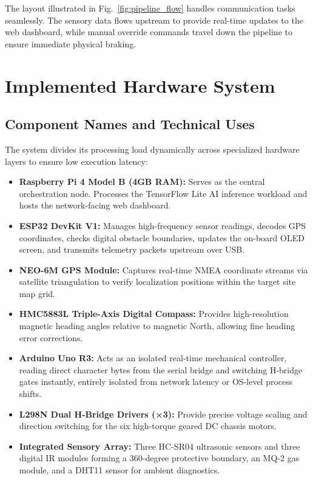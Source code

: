 \documentclass[conference]{IEEEtran}
\begin{document}
The layout illustrated in Fig.~\ref{fig:pipeline_flow} handles communication tasks seamlessly. The sensory data flows upstream to provide real-time updates to the web dashboard, while manual override commands travel down the pipeline to ensure immediate physical braking.

\section{Implemented Hardware System}

\subsection{Component Names and Technical Uses}
The system divides its processing load dynamically across specialized hardware layers to ensure low execution latency:
\begin{itemize}
    \item \textbf{Raspberry Pi 4 Model B (4GB RAM):} Serves as the central orchestration node. Processes the TensorFlow Lite AI inference workload and hosts the network-facing web dashboard.
    \item \textbf{ESP32 DevKit V1:} Manages high-frequency sensor readings, decodes GPS coordinates, checks digital obstacle boundaries, updates the on-board OLED screen, and transmits telemetry packets upstream over USB.
    \item \textbf{NEO-6M GPS Module:} Captures real-time NMEA coordinate streams via satellite triangulation to verify localization positions within the target site map grid.
    \item \textbf{HMC5883L Triple-Axis Digital Compass:} Provides high-resolution magnetic heading angles relative to magnetic North, allowing fine heading error corrections.
    \item \textbf{Arduino Uno R3:} Acts as an isolated real-time mechanical controller, reading direct character bytes from the serial bridge and switching H-bridge gates instantly, entirely isolated from network latency or OS-level process shifts.
    \item \textbf{L298N Dual H-Bridge Drivers (×3):} Provide precise voltage scaling and direction switching for the six high-torque geared DC chassis motors.
    \item \textbf{Integrated Sensory Array:} Three HC-SR04 ultrasonic sensors and three digital IR modules forming a 360-degree protective boundary, an MQ-2 gas module, and a DHT11 sensor for ambient diagnostics.
\end{itemize}
\end{document}
